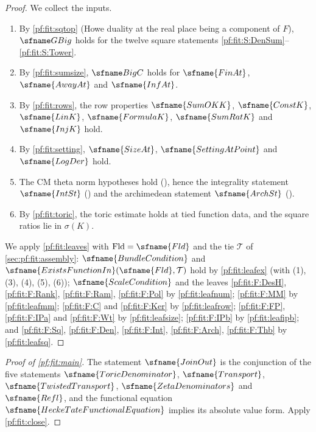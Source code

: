 \begin{proof}
We collect the inputs.
\begin{enumerate}[label=(\arabic*),leftmargin=*]
\item By \cref{pf:fit:sqtop} (Howe duality at the real place being a component of $F$), $\fitGBig$ holds for the twelve
square statements \ref{pf:fit:S:DenSum}--\ref{pf:fit:S:Tower}.
\item By \cref{pf:fit:sumsize}, $\fitBigC$ holds for $\sfname{FinAt}$, $\sfname{AwayAt}$ and $\sfname{InfAt}$.
\item By \cref{pf:fit:rows}, the row properties $\sfname{SumOKK}$, $\sfname{ConstK}$, $\sfname{LinK}$, $\sfname{FormulaK}$,
$\sfname{SumRatK}$ and $\sfname{InjK}$ hold.
\item By \cref{pf:fit:setting}, $\sfname{SizeAt}$, $\sfname{SettingAtPoint}$ and $\sfname{LogDer}$ hold.
\item The CM theta norm hypotheses hold (), hence the
integrality statement $\sfname{IntSt}$ () and the
archimedean statement $\sfname{ArchSt}$ ().
\item By \cref{pf:fit:toric}, the toric estimate holds at tied function data, and the square ratios lie in $\sigma(K)$.
\end{enumerate}
We apply \cref{pf:fit:leaves} with $\mathrm{Fld}=\sfname{Fld}$ and the tie $\mathcal T$ of \cref{sec:pf:fit:assembly}:
$\sfname{BundleCondition}$ and $\sfname{ExistsFunctionIn}(\sfname{Fld},\mathcal T)$ hold by \cref{pf:fit:leafex} (with (1), (3), (4),
(5), (6)); $\sfname{ScaleCondition}$ and the leaves \ref{pf:fit:F:DesH}, \ref{pf:fit:F:Rank}, \ref{pf:fit:F:Ram},
\ref{pf:fit:F:Pol} by \cref{pf:fit:leafnum}; \ref{pf:fit:F:MM} by \cref{pf:fit:leafmm}; \ref{pf:fit:F:C} and
\ref{pf:fit:F:Ker} by \cref{pf:fit:leafrow}; \ref{pf:fit:F:FP}, \ref{pf:fit:F:IPa} and \ref{pf:fit:F:Wt} by
\cref{pf:fit:leafsize}; \ref{pf:fit:F:IPb} by \cref{pf:fit:leafipb}; and \ref{pf:fit:F:Sq}, \ref{pf:fit:F:Den},
\ref{pf:fit:F:Int}, \ref{pf:fit:F:Arch}, \ref{pf:fit:F:Thb} by \cref{pf:fit:leafsq}.
\end{proof}

\begin{proof}[Proof of \cref{pf:fit:main}]
The statement $\sfname{JoinOut}$ is the conjunction of the five statements $\sfname{ToricDenominator}$,
$\sfname{Transport}$, $\sfname{TwistedTransport}$, $\sfname{ZetaDenominators}$ and $\sfname{Refl}$, and the functional
equation $\sfname{HeckeTateFunctionalEquation}$ implies its absolute value form. Apply \cref{pf:fit:close}.
\end{proof}

